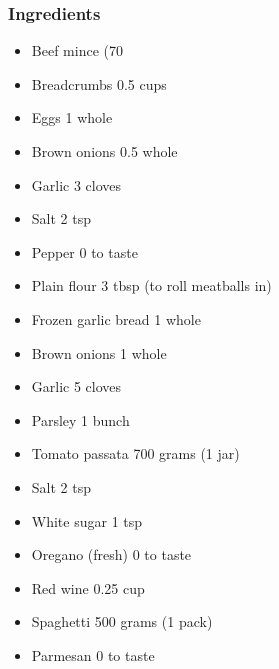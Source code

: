 \documentclass[]{article}
\begin{document}
\subsubsection*{\Large Ingredients}
\begin{multicols}{2}
\begin{itemize}
 \item Beef mince (70%
 \item Breadcrumbs \hfill 0.5 cups
 \item Eggs \hfill 1 whole
 \item Brown onions \hfill 0.5 whole
 \item Garlic \hfill 3 cloves
 \item Salt \hfill 2 tsp
 \item Pepper \hfill 0 to taste
 \item Plain flour \hfill 3 tbsp (to roll meatballs in)
 \item Frozen garlic bread \hfill 1 whole
 \item Brown onions \hfill 1 whole
 \item Garlic \hfill 5 cloves
 \item Parsley \hfill 1 bunch
 \item Tomato passata \hfill 700 grams (1 jar)
 \item Salt \hfill 2 tsp
 \item White sugar \hfill 1 tsp
 \item Oregano (fresh) \hfill 0 to taste
 \item Red wine \hfill 0.25 cup
 \item Spaghetti \hfill 500 grams (1 pack)
 \item Parmesan \hfill 0 to taste
\end{itemize}
\end{multicols}
\end{document}

